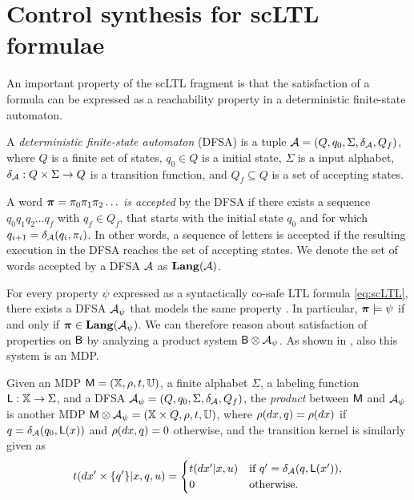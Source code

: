 \documentclass{ifacconf}
\begin{document}
\section{Control synthesis for scLTL formulae}
\label{sec:exact_synth}

An important property of the scLTL fragment is that the satisfaction of a formula can be expressed as a reachability property in a deterministic finite-state automaton.

\begin{definition}
  A \emph{deterministic finite-state automaton} (DFSA) is a tuple $\mathcal{A} = (Q, q_0, \Sigma, \delta_{\mathcal{A}}, Q_f)$, where $Q$ is a finite set of states, $q_0 \in Q$ is a initial state, $\Sigma$ is a input alphabet, $\delta_{\mathcal{A}} : Q \times \Sigma \rightarrow Q$ is a transition function, and $Q_f\subseteq Q$ is a set of accepting states.

  A word ${\boldsymbol{\pi}} = \pi_0 \pi_1 \pi_2 \ldots$ \emph{is accepted} by the DFSA if there exists a sequence $q_0 q_1 q_2 \ldots q_f$ with $q_f\in Q_f$, that starts with the initial state $q_0$ and for which $q_{i+1}=\delta_{\mathcal{A}}(q_i,\pi_i)$. In other words, a sequence of letters is accepted if the resulting execution in the DFSA reaches the set of accepting states. We denote the set of words accepted by a DFSA $\mathcal{A}$ as $\mathbf{Lang} (\mathcal A)$.
\end{definition}

For every property $\psi$ expressed as a syntactically co-safe LTL formula \eqref{eq:scLTL}, there exists a DFSA  $\mathcal{A}_\psi$ that models the same property \citep{Belta2017}. In particular, ${\boldsymbol{\pi}}\models\psi$ if and only if ${\boldsymbol{\pi}}\in \mathbf{Lang}(\mathcal{A}_\psi)$. We can therefore reason about satisfaction of properties on $\mathsf{B}$ by analyzing a product system $\mathsf{B} \otimes \mathcal{A}_\psi$. As shown in \citep{tmka2013}, also this system is an MDP.

\begin{definition}
\label{def:product}
  Given an MDP $\mathsf{M} = ({\mathbb{X}}, \rho, t, {\mathbb{U}})$, a finite alphabet $\Sigma$, a labeling function $\mathsf{L} : {\mathbb{X}}\rightarrow\Sigma$, and a DFSA  $\mathcal{A}_\psi = (Q, q_0, \Sigma, \delta_{\mathcal{A}}, Q_f)$, the \emph{product} between $\mathsf{M}$ and $\mathcal{A}_\psi$ is another MDP $\mathsf{M}\otimes\mathcal{A}_\psi = ({\mathbb{X}} \times Q, \relax\rho, \relax{t}, {\mathbb{U}})$, where $\relax\rho(dx,q) = \rho(dx)$ if $q= \delta_{\mathcal{A}}(q_0,\mathsf L(x))$ and $ \relax\rho(dx,q) =0$ otherwise, and the transition kernel is similarly given as
  \begin{equation*}
    \relax{t}(d x'\times\{q'\}|x,q,u) = \begin{cases}t(dx'|x,u)& \text{if } q' =\delta_{\mathcal{A}}(q,\mathsf{L}(x')),\\ 0 & \text{otherwise.}  \end{cases}
  \end{equation*}
\end{definition}
\end{document}
